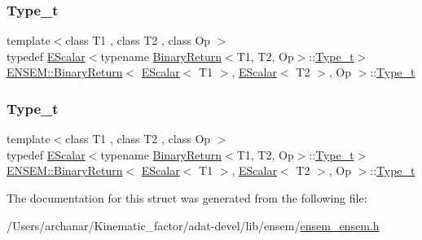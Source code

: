 \subsubsection{\texorpdfstring{Type\_t}{Type\_t}\hspace{0.1cm}{\footnotesize\ttfamily [2/3]}}
{\footnotesize\ttfamily template$<$class T1 , class T2 , class Op $>$ \\
typedef \mbox{\hyperlink{classENSEM_1_1EScalar}{E\+Scalar}}$<$typename \mbox{\hyperlink{structENSEM_1_1BinaryReturn}{Binary\+Return}}$<$T1, T2, Op$>$\+::\mbox{\hyperlink{structENSEM_1_1BinaryReturn_3_01EScalar_3_01T1_01_4_00_01EScalar_3_01T2_01_4_00_01Op_01_4_ab1c1fc79ebef8ef1bc2790edad248056}{Type\+\_\+t}}$>$ \mbox{\hyperlink{structENSEM_1_1BinaryReturn}{E\+N\+S\+E\+M\+::\+Binary\+Return}}$<$ \mbox{\hyperlink{classENSEM_1_1EScalar}{E\+Scalar}}$<$ T1 $>$, \mbox{\hyperlink{classENSEM_1_1EScalar}{E\+Scalar}}$<$ T2 $>$, Op $>$\+::\mbox{\hyperlink{structENSEM_1_1BinaryReturn_3_01EScalar_3_01T1_01_4_00_01EScalar_3_01T2_01_4_00_01Op_01_4_ab1c1fc79ebef8ef1bc2790edad248056}{Type\+\_\+t}}}

\mbox{\label{structENSEM_1_1BinaryReturn_3_01EScalar_3_01T1_01_4_00_01EScalar_3_01T2_01_4_00_01Op_01_4_ab1c1fc79ebef8ef1bc2790edad248056}} 
\subsubsection{\texorpdfstring{Type\_t}{Type\_t}\hspace{0.1cm}{\footnotesize\ttfamily [3/3]}}
{\footnotesize\ttfamily template$<$class T1 , class T2 , class Op $>$ \\
typedef \mbox{\hyperlink{classENSEM_1_1EScalar}{E\+Scalar}}$<$typename \mbox{\hyperlink{structENSEM_1_1BinaryReturn}{Binary\+Return}}$<$T1, T2, Op$>$\+::\mbox{\hyperlink{structENSEM_1_1BinaryReturn_3_01EScalar_3_01T1_01_4_00_01EScalar_3_01T2_01_4_00_01Op_01_4_ab1c1fc79ebef8ef1bc2790edad248056}{Type\+\_\+t}}$>$ \mbox{\hyperlink{structENSEM_1_1BinaryReturn}{E\+N\+S\+E\+M\+::\+Binary\+Return}}$<$ \mbox{\hyperlink{classENSEM_1_1EScalar}{E\+Scalar}}$<$ T1 $>$, \mbox{\hyperlink{classENSEM_1_1EScalar}{E\+Scalar}}$<$ T2 $>$, Op $>$\+::\mbox{\hyperlink{structENSEM_1_1BinaryReturn_3_01EScalar_3_01T1_01_4_00_01EScalar_3_01T2_01_4_00_01Op_01_4_ab1c1fc79ebef8ef1bc2790edad248056}{Type\+\_\+t}}}



The documentation for this struct was generated from the following file\+:\begin{DoxyCompactItemize}
\item 
/\+Users/archanar/\+Kinematic\+\_\+factor/adat-\/devel/lib/ensem/\mbox{\hyperlink{adat-devel_2lib_2ensem_2ensem__ensem_8h}{ensem\+\_\+ensem.\+h}}\end{DoxyCompactItemize}

